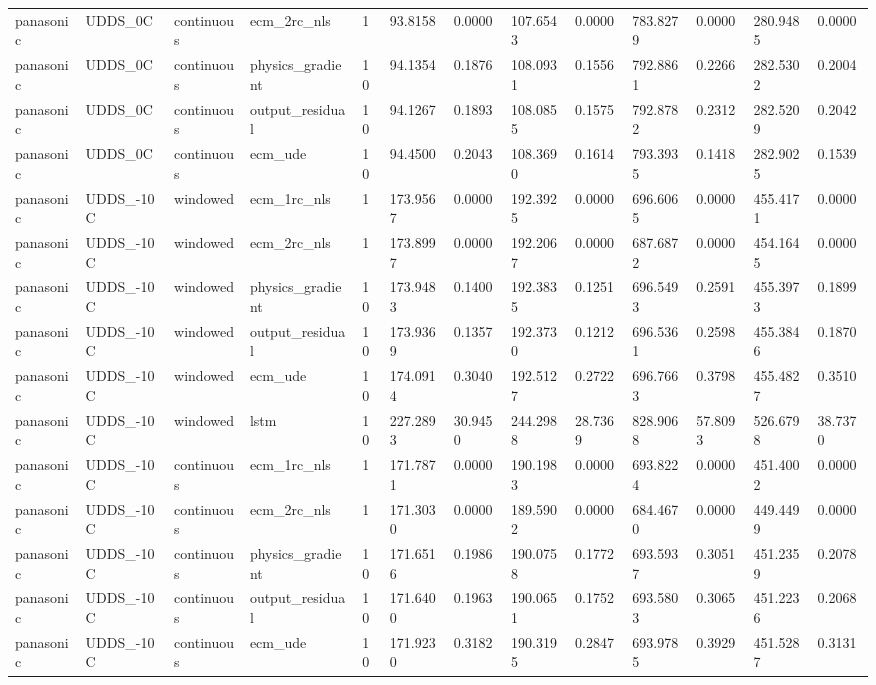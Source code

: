 \begin{tabular}{lllllllllllll}
panasonic & UDDS\_0C & continuous & ecm\_2rc\_nls & 1 & 93.8158 & 0.0000 & 107.6543 & 0.0000 & 783.8279 & 0.0000 & 280.9485 & 0.0000 \\
panasonic & UDDS\_0C & continuous & physics\_gradient & 10 & 94.1354 & 0.1876 & 108.0931 & 0.1556 & 792.8861 & 0.2266 & 282.5302 & 0.2004 \\
panasonic & UDDS\_0C & continuous & output\_residual & 10 & 94.1267 & 0.1893 & 108.0855 & 0.1575 & 792.8782 & 0.2312 & 282.5209 & 0.2042 \\
panasonic & UDDS\_0C & continuous & ecm\_ude & 10 & 94.4500 & 0.2043 & 108.3690 & 0.1614 & 793.3935 & 0.1418 & 282.9025 & 0.1539 \\
panasonic & UDDS\_-10C & windowed & ecm\_1rc\_nls & 1 & 173.9567 & 0.0000 & 192.3925 & 0.0000 & 696.6065 & 0.0000 & 455.4171 & 0.0000 \\
panasonic & UDDS\_-10C & windowed & ecm\_2rc\_nls & 1 & 173.8997 & 0.0000 & 192.2067 & 0.0000 & 687.6872 & 0.0000 & 454.1645 & 0.0000 \\
panasonic & UDDS\_-10C & windowed & physics\_gradient & 10 & 173.9483 & 0.1400 & 192.3835 & 0.1251 & 696.5493 & 0.2591 & 455.3973 & 0.1899 \\
panasonic & UDDS\_-10C & windowed & output\_residual & 10 & 173.9369 & 0.1357 & 192.3730 & 0.1212 & 696.5361 & 0.2598 & 455.3846 & 0.1870 \\
panasonic & UDDS\_-10C & windowed & ecm\_ude & 10 & 174.0914 & 0.3040 & 192.5127 & 0.2722 & 696.7663 & 0.3798 & 455.4827 & 0.3510 \\
panasonic & UDDS\_-10C & windowed & lstm & 10 & 227.2893 & 30.9450 & 244.2988 & 28.7369 & 828.9068 & 57.8093 & 526.6798 & 38.7370 \\
panasonic & UDDS\_-10C & continuous & ecm\_1rc\_nls & 1 & 171.7871 & 0.0000 & 190.1983 & 0.0000 & 693.8224 & 0.0000 & 451.4002 & 0.0000 \\
panasonic & UDDS\_-10C & continuous & ecm\_2rc\_nls & 1 & 171.3030 & 0.0000 & 189.5902 & 0.0000 & 684.4670 & 0.0000 & 449.4499 & 0.0000 \\
panasonic & UDDS\_-10C & continuous & physics\_gradient & 10 & 171.6516 & 0.1986 & 190.0758 & 0.1772 & 693.5937 & 0.3051 & 451.2359 & 0.2078 \\
panasonic & UDDS\_-10C & continuous & output\_residual & 10 & 171.6400 & 0.1963 & 190.0651 & 0.1752 & 693.5803 & 0.3065 & 451.2236 & 0.2068 \\
panasonic & UDDS\_-10C & continuous & ecm\_ude & 10 & 171.9230 & 0.3182 & 190.3195 & 0.2847 & 693.9785 & 0.3929 & 451.5287 & 0.3131 \\

\end{tabular}

